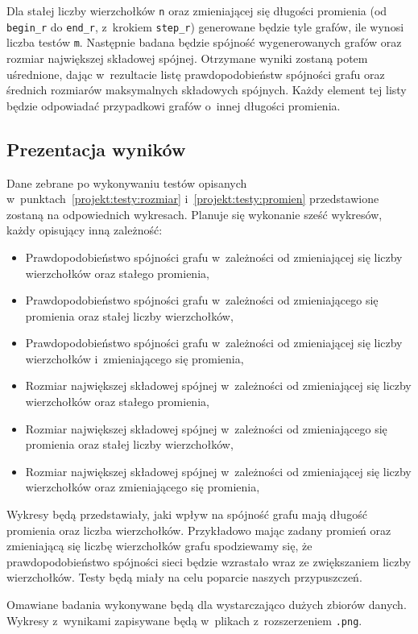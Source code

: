 			Dla stałej liczby wierzchołków \texttt{n} oraz zmieniającej się długości promienia (od \texttt{begin\_r} do \texttt{end\_r}, z~krokiem \texttt{step\_r}) generowane będzie tyle grafów, ile wynosi liczba testów \texttt{m}. Następnie badana będzie spójność wygenerowanych grafów oraz rozmiar największej składowej spójnej. Otrzymane wyniki zostaną potem uśrednione, dając w~rezultacie listę prawdopodobieństw spójności grafu oraz średnich rozmiarów maksymalnych składowych spójnych. Każdy element tej listy będzie odpowiadać przypadkowi grafów o~innej długości promienia.

		\subsection{Prezentacja wyników}
			\label{projekt:testy:wyniki}

			Dane zebrane po wykonywaniu testów opisanych w~punktach~\ref{projekt:testy:rozmiar} i~\ref{projekt:testy:promien} przedstawione zostaną na odpowiednich wykresach. Planuje się wykonanie sześć wykresów, każdy opisujący inną zależność:
			\begin{itemize}
				\item Prawdopodobieństwo spójności grafu w~zależności od zmieniającej się liczby wierzchołków oraz stałego promienia,
				\item Prawdopodobieństwo spójności grafu w~zależności od zmieniającego się promienia oraz stałej liczby wierzchołków,
				\item Prawdopodobieństwo spójności grafu w~zależności od zmieniającej się liczby wierzchołków i~zmieniającego się promienia,
				\item Rozmiar największej składowej spójnej w~zależności od zmieniającej się liczby wierzchołków oraz stałego promienia,
				\item Rozmiar największej składowej spójnej w~zależności od zmieniającego się promienia oraz stałej liczby wierzchołków,
				\item Rozmiar największej składowej spójnej w~zależności od zmieniającej się liczby wierzchołków oraz zmieniającego się promienia,
			\end{itemize}

			Wykresy będą przedstawiały, jaki wpływ na spójność grafu mają długość promienia oraz liczba wierzchołków. Przykładowo mając zadany promień oraz zmieniającą się liczbę wierzchołków grafu spodziewamy się, że prawdopodobieństwo spójności sieci będzie wzrastało wraz ze zwiększaniem liczby wierzchołków. Testy będą miały na celu poparcie naszych przypuszczeń.

			Omawiane badania wykonywane będą dla wystarczająco dużych zbiorów danych. Wykresy z~wynikami zapisywane będą w~plikach z~rozszerzeniem \texttt{.png}.
